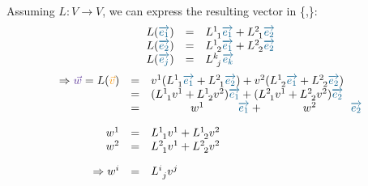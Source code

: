 Assuming $L: V\rightarrow V$, we can express the resulting vector in
\{,\}:
\begin{equation}
    \label{eq:linear_map_derive_matrix_multiplication_2}
    \begin{array}{rcl}
        L(\hdbv{1}) & = & L^{1~}_{~1}\hdbv{1} + L^{2~}_{~1}\hdbv{2} \\
        L(\hdbv{2}) & = & L^{1~}_{~2}\hdbv{1} + L^{2~}_{~2}\hdbv{2} \\
        L(\hdbv{j}) & = & L^{k~}_{~j}\hdbv{k}
    \end{array}
\end{equation}
\begin{equation}
    \label{eq:linear_map_derive_matrix_multiplication_3}
    \begin{array}{rcl}
        \Rightarrow\textcolor{RoyalPurple}{\vec{w}} =
        L(\textcolor{YellowOrange}{\vec{v}}) & = &
        \hdvc{1}(L^{1~}_{~1}\hdbv{1} + L^{2~}_{~1}\hdbv{2}) +
        \hdvc{2}(L^{1~}_{~2}\hdbv{1} + L^{2~}_{~2}\hdbv{2}) \\
        & = & (L^{1~}_{~1}\hdvc{1}+ L^{1~}_{~2}\hdvc{2})\hdbv{1} +
        (L^{2~}_{~1}\hdvc{1} + L^{2~}_{~2}\hdvc{2})\hdbv{2} \\
        & = & \hspace{35pt}w^1\hspace{30pt}\hdbv{1} +
        \hspace{35pt}w^2\hspace{30pt}\hdbv{2} \\
        \noalign{\vskip10pt}
        w^1 & = & L^{1~}_{~1}\hdvc{1}+ L^{1~}_{~2}\hdvc{2} \\
        w^2 & = & L^{2~}_{~1}\hdvc{1} + L^{2~}_{~2}\hdvc{2} \\
        \noalign{\vskip10pt}
        \Rightarrow w^i & = &
        L^{i~}_{~j}\hdvc{j}
    \end{array}
\end{equation}


